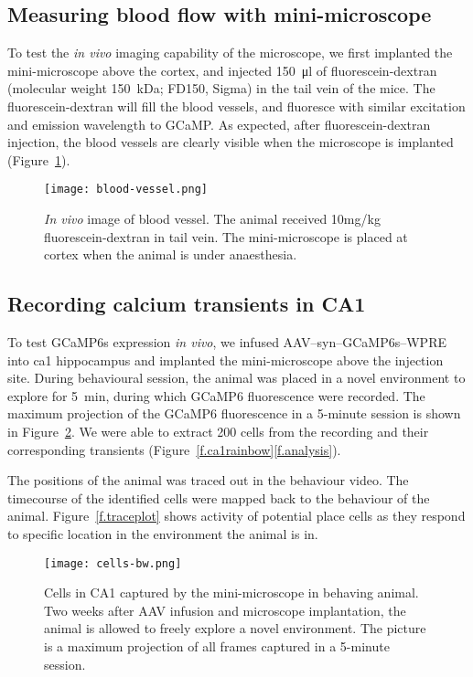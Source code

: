 \subsection{Measuring blood flow with mini-microscope}
To test the \textit{in vivo} imaging capability of the microscope, we first implanted the mini-microscope above the cortex, and injected \SI{150}{\ul} of fluorescein-dextran (molecular weight \SI{150}{\kilo\dalton}; FD150, Sigma) in the tail vein of the mice. The fluorescein-dextran will fill the blood vessels, and fluoresce with similar excitation and emission wavelength to GCaMP. As expected, after fluorescein-dextran injection, the blood vessels are clearly visible when the microscope is implanted (Figure~\ref{f.bloodvessel}).
\begin{figure}[h]
    \texttt{[image: blood-vessel.png]}
    \caption{\textit{In vivo} image of blood vessel. The animal received 10mg/kg fluorescein-dextran in tail vein. The mini-microscope is placed at cortex when the animal is under anaesthesia. \label{f.bloodvessel}}
\end{figure}


\subsection{Recording calcium transients in CA1}
To test GCaMP6s expression \textit{in vivo}, we infused AAV--syn--GCaMP6s--WPRE into \gls{ca1} hippocampus and implanted the mini-microscope above the injection site. During behavioural session, the animal was placed in a novel environment to explore for \SI{5}{\minute}, during which GCaMP6 fluorescence were recorded. The maximum projection of the GCaMP6 fluorescence in a 5-minute session is shown in Figure~\ref{f.ca1bw}. We were able to extract 200 cells from the recording and their corresponding  transients (Figure~\ref{f.ca1rainbow}\ref{f.analysis}).

The positions of the animal was traced out in the behaviour video. The timecourse of the identified cells were mapped back to the behaviour of the animal. Figure~\ref{f.traceplot} shows  activity of potential place cells as they respond to specific location in the environment the animal is in.
\begin{figure}[h]
    \texttt{[image: cells-bw.png]}
    \caption{Cells in CA1 captured by the mini-microscope in behaving animal. Two weeks after AAV infusion and microscope implantation, the animal is allowed to freely explore a novel environment. The picture is a maximum projection of all frames captured in a 5-minute session. \label{f.ca1bw}}
\end{figure}

